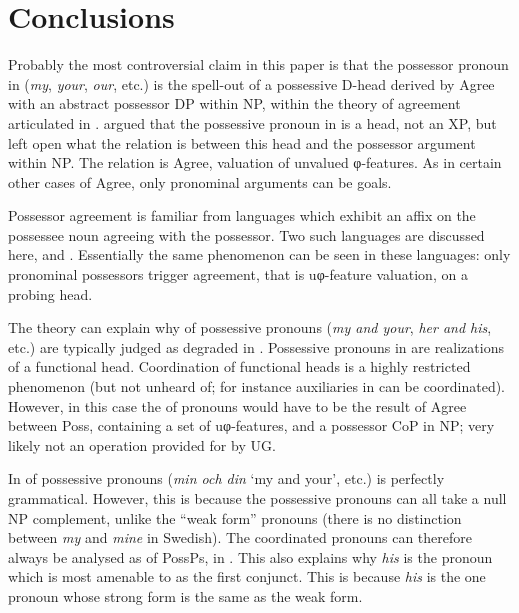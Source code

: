 \documentclass[output=paper]{langsci/langscibook}
\begin{document}
\section{Conclusions}\label{sec:16.4}\largerpage[2]

Probably the most controversial claim in this paper is that the possessor
pronoun in  (\emph{my}, \emph{your}, \emph{our}, etc.) is the spell-out
of a possessive D-head derived by Agree with an abstract possessor DP within
NP, within the theory of agreement articulated in
\textcite{Roberts2010,Roberts2010b}.  \citet{Delsing1998} argued that the
possessive pronoun in  is a head, not an XP, but left open what the
relation is between this head and the possessor argument within NP. The
relation is Agree, valuation of unvalued φ-features. As in certain other
cases of Agree, only pronominal arguments can be goals.

Possessor agreement is familiar from languages which exhibit an affix on the
possessee noun agreeing with the possessor. Two such languages are discussed
here,  and . Essentially the same phenomenon can be seen in
these languages: only pronominal possessors trigger agreement, that is
uφ-feature valuation, on a probing head.

The theory can explain why  of possessive pronouns (\emph{my and
your}, \emph{her and his}, etc.) are typically judged as degraded in .
Possessive pronouns in  are realizations of a functional head.
Coordination of functional heads is a highly restricted phenomenon (but not
unheard of; for instance auxiliaries in  can be coordinated). However,
in this case the  of pronouns would have to be the result of Agree
between Poss, containing a set of uφ-features, and a possessor CoP in NP; very
likely not an operation provided for by UG.

In   of possessive pronouns (\emph{min och din} `my and
your', etc.) is perfectly grammatical. However, this is because the 
possessive pronouns can all take a null NP complement, unlike the 
\enquote{weak form} pronouns (there is no distinction between \emph{my} and
\emph{mine} in Swedish). The coordinated pronouns can therefore always be
analysed as  of PossPs, in . This also explains why
\emph{his} is the  pronoun which is most amenable to  as the
first conjunct.  This is because \emph{his} is the one pronoun whose strong
form is the same as the weak form.
\end{document}
